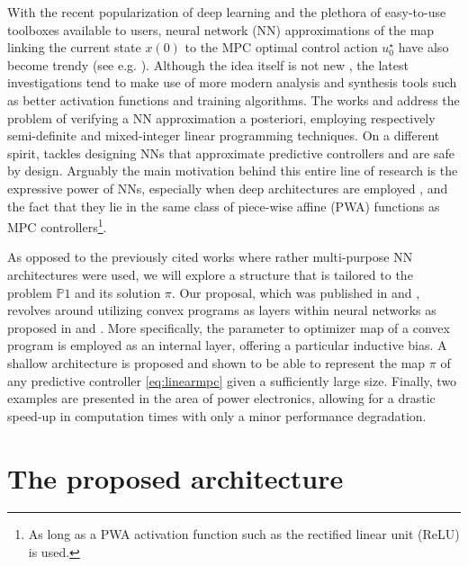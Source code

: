 With the recent popularization of deep learning and the plethora of easy-to-use toolboxes available to users, neural network (NN) approximations of the map linking the current state $x(0)$ to the MPC optimal control action $u_0^\star$ have also become trendy (see e.g. \cite{karg2020efficient,kumar2021industrial}). Although the idea itself is not new \citep{parisini1995receding}, the latest investigations tend to make use of more modern analysis and synthesis tools such as better activation functions and training algorithms. The works \cite{fazlyab2020safety} and \cite{schwan2022stability} address the problem of verifying a NN approximation a posteriori, employing respectively semi-definite and mixed-integer linear programming techniques. On a different spirit, \cite{paulson2020approximate} tackles designing NNs that approximate predictive controllers and are safe by design. Arguably the main motivation behind this entire line of research is the expressive power of NNs, especially when deep architectures are employed \cite{karg2020efficient}, and the fact that they lie in the same class of piece-wise affine (PWA) functions as MPC controllers\footnote{As long as a PWA activation function such as the rectified linear unit (ReLU) is used.}.

As opposed to the previously cited works where rather multi-purpose NN architectures were used, we will explore a structure that is tailored to the problem $\mathds{P}1$ and its solution $\pi$. Our proposal, which was published in \cite{maddalena2020neural} and \cite{maddalena2021embedded}, revolves around utilizing convex programs as layers within neural networks as proposed in \cite{amos2017optnet} and \cite{agrawal2019differentiable}. More specifically, the parameter to optimizer map of a convex program is employed as an internal layer, offering a particular inductive bias. A shallow architecture is proposed and shown to be able to represent the map $\pi$ of any predictive controller \eqref{eq:linearmpc} given a sufficiently large size. Finally, two examples are presented in the area of power electronics, allowing for a drastic speed-up in computation times with only a minor performance degradation.
	
\section{The proposed architecture}

